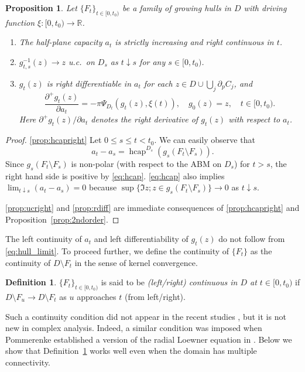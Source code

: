 \documentclass[preprint,12pt]{elsarticle}
\newtheorem{prop}[thm]{Proposition}
\theoremstyle{definition}
\newtheorem{dfn}[thm]{Definition}
\newcommand{\R}{\mathbb{R}}
\DeclareMathOperator{\hcap}{hcap}
\begin{document}
\begin{prop} \label{prop:KLright}
Let $\{F_t\}_{t \in [0,t_0)}$ be a family of growing hulls in $D$
with driving function $\xi \colon [0, t_0) \to \R$.
\begin{enumerate}
\item \label{prop:hcapright}
The half-plane capacity $a_t$ is strictly increasing and right continuous in $t$.
\item \label{prop:ucright}
$g_{t,s}^{-1}(z) \to z$ u.c.\ on $D_s$ as $t \downarrow s$ for any $s \in [0, t_0)$.
\item \label{prop:rdiff}
$g_t(z)$ is right differentiable in $a_t$
for each $z \in D \cup \bigcup_j \partial_p C_j$, and
\begin{equation} \label{eq:KLright}
\frac{\partial^+ g_t(z)}{\partial a_t} = -\pi \Psi_{D_t}(g_t(z), \xi(t)),
\quad g_0(z)=z,\quad t \in [0, t_0).
\end{equation}
Here $\partial^+ g_t(z)/\partial a_t$ denotes the right derivative of $g_t(z)$
with respect to $a_t$.
\end{enumerate}
\end{prop}

\begin{proof}
\eqref{prop:hcapright}
Let $0 \leq s \leq t < t_0$.
We can easily observe that
\[
a_t-a_s=\hcap^{D_s}(g_s(F_t \setminus F_s)).
\]
Since $g_s(F_t \setminus F_s)$ is non-polar (with respect to the ABM on $D_s$)
for $t>s$, the right hand side is positive by \eqref{eq:hcap}.
\eqref{eq:hcap} also implies $\lim_{t \downarrow s}(a_t-a_s)=0$
because $\sup\{\Im z; z \in g_s(F_t \setminus F_s)\} \to 0$ as $t \downarrow s$.

\eqref{prop:ucright} and \eqref{prop:rdiff} are immediate consequences
of \eqref{prop:hcapright} and Proposition~\ref{prop:2ndorder}.
\end{proof}

The left continuity of $a_t$ and left differentiability of $g_t(z)$ do not follow
from \eqref{eq:hull_limit}.
To proceed further, we define the continuity of $\{F_t\}$
as the continuity of $D \setminus F_t$ in the sense of kernel convergence.

\begin{dfn} \label{dfn:cont}
$\{F_t\}_{t \in [0,t_0)}$ is said to be
\emph{(left/right) continuous in $D$ at $t \in [0, t_0)$}
if $D \setminus F_u \to D \setminus F_t$
as $u$ approaches $t$ (from left/right).
\end{dfn}

Such a continuity condition did not appear
in the recent studies \cite{BF08, La06, Dr11, CFR16, CF18},
but it is not new in complex analysis.
Indeed, a similar condition was imposed
when Pommerenke established a version of the radial Loewner equation
in \cite[Section~6.1]{Po75}.
Below we show that Definition~\ref{dfn:cont} works well
even when the domain has multiple connectivity.
\end{document}
